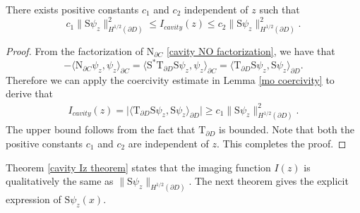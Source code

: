 \documentclass[final]{siamltex}
\begin{document}
\begin{theorem} \label{cavity Iz theorem}
There exists positive constants $c_1$ and $c_2$ independent of $z$ such that
\begin{equation}
c_1 \|  \mathrm{S} \psi_z\|^2_{H^{1/2}(\partial D)}\le   I_{cavity}(z) \le c_2  \|  \mathrm{S} \psi_z\|^2_{H^{1/2}(\partial D)}.
\end{equation}
\end{theorem}
\begin{proof}
From the factorization of $\mathrm{N}_{\partial C}$ \eqref{cavity NO factorization}, we have that
\begin{equation} \label{cavity Iz proof eqn1}
-\langle   \mathrm{N}_{\partial C} \psi_z, \psi_z \rangle_{\partial C} =\langle   \mathrm{S}^*\mathrm{T}_{\partial D}\mathrm{S} \psi_z, \psi_z \rangle_{\partial C} = \langle  \mathrm{T}_{\partial D} \mathrm{S} \psi_z,\mathrm{S} \psi_z \rangle_{\partial D} .
\end{equation}
Therefore we can apply the coercivity estimate in Lemma \ref{mo coercivity} to derive that
\begin{eqnarray*}
I_{cavity}(z) =  \big|  \langle  \mathrm{T}_{\partial D} \mathrm{S} \psi_z,\mathrm{S} \psi_z \rangle_{\partial D} \big|   \ge c_1 \|  \mathrm{S} \psi_z\|^2_{H^{1/2}(\partial D)}.
\end{eqnarray*}
The upper bound follows from the fact that $ \mathrm{T}_{\partial D}$ is bounded. Note that both the positive constants $c_1$ and $c_2$ are independent of $z$. This completes the proof.
\end{proof}

Theorem \ref{cavity Iz theorem} states that the imaging function $I(z)$ is qualitatively the same as $\|  \mathrm{S} \psi_z\|_{H^{1/2}(\partial D)}$. The next theorem gives the explicit expression of $\mathrm{S} \psi_z (x)$.
\end{document}
